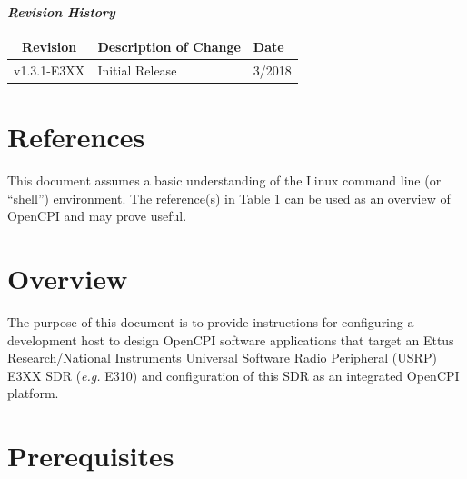 	\begin{center}
	\textit{\textbf{Revision History}}
		\begin{table}[H]
		\label{table:revisions} %
			\begin{tabularx}{\textwidth}{|c|X|l|}
			\hline
			\rowcolor{blue}
			\textbf{Revision} & \textbf{Description of Change} & \textbf{Date} \\
		    \hline
		    v1.3.1-E3XX & Initial Release & 3/2018 \\
			\hline
			\end{tabularx}
		\end{table}
	\end{center}

\newpage

\tableofcontents

\newpage

\section{References}

	This document assumes a basic understanding of the Linux command line (or ``shell'') environment.  The reference(s) in Table 1 can be used as an overview of OpenCPI and may prove useful.

\def\refcapbottom{}


\newpage
\section{Overview}
The purpose of this document is to provide instructions for configuring a development host to design OpenCPI software applications that target an Ettus Research/National Instruments Universal Software Radio Peripheral (USRP) E3XX SDR (\textit{e.g.} E310) and configuration of this SDR as an integrated OpenCPI platform.

\section{Prerequisites}
